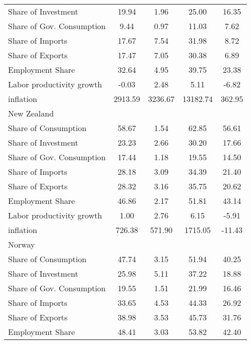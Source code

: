 {\begin{longtable}{l*{1}{cccc}}
Share of Investment &       19.94&        1.96&       25.00&       16.35\\
Share of Gov. Consumption&        9.44&        0.97&       11.03&        7.62\\
Share of Imports    &       17.67&        7.54&       31.98&        8.72\\
Share of Exports    &       17.47&        7.05&       30.38&        6.89\\
Employment Share    &       32.64&        4.95&       39.75&       23.38\\
Labor productivity growth&       -0.03&        2.48&        5.11&       -6.82\\
inflation           &     2913.59&     3236.67&    13182.74&      362.95\\
New Zealand         &            &            &            &            \\
Share of Consumption&       58.67&        1.54&       62.85&       56.61\\
Share of Investment &       23.23&        2.66&       30.20&       17.66\\
Share of Gov. Consumption&       17.44&        1.18&       19.55&       14.50\\
Share of Imports    &       28.18&        3.09&       34.39&       21.40\\
Share of Exports    &       28.32&        3.16&       35.75&       20.62\\
Employment Share    &       46.86&        2.17&       51.81&       43.14\\
Labor productivity growth&        1.00&        2.76&        6.15&       -5.91\\
inflation           &      726.38&      571.90&     1715.05&      -11.43\\
Norway              &            &            &            &            \\
Share of Consumption&       47.74&        3.15&       51.94&       40.25\\
Share of Investment &       25.98&        5.11&       37.22&       18.88\\
Share of Gov. Consumption&       19.55&        1.51&       21.99&       16.46\\
Share of Imports    &       33.65&        4.53&       44.33&       26.92\\
Share of Exports    &       38.98&        3.53&       45.73&       31.76\\
Employment Share    &       48.41&        3.03&       53.82&       42.40\\

\end{longtable}}
